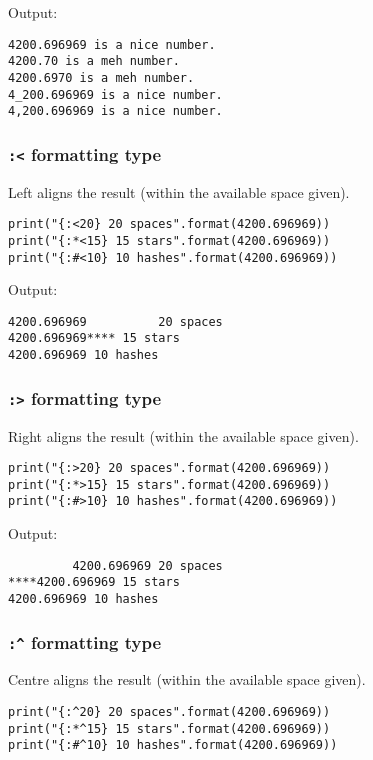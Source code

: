 \documentclass[11pt]{article}
\begin{document}
 \noindent Output:

\label{org632bb04}
\begin{verbatim}
4200.696969 is a nice number.
4200.70 is a meh number.
4200.6970 is a meh number.
4_200.696969 is a nice number.
4,200.696969 is a nice number.
\end{verbatim}
\subsubsection{\texttt{:<} formatting type}
\label{sec:org0985c48}
Left aligns the result (within the available space given).

\begin{verbatim}
print("{:<20} 20 spaces".format(4200.696969))
print("{:*<15} 15 stars".format(4200.696969))
print("{:#<10} 10 hashes".format(4200.696969))
\end{verbatim}

 \noindent Output:

\label{org31b7475}
\begin{verbatim}
4200.696969          20 spaces
4200.696969**** 15 stars
4200.696969 10 hashes
\end{verbatim}
\subsubsection{\texttt{:>} formatting type}
\label{sec:org7b2e0c6}
Right aligns the result (within the available space given).

\begin{verbatim}
print("{:>20} 20 spaces".format(4200.696969))
print("{:*>15} 15 stars".format(4200.696969))
print("{:#>10} 10 hashes".format(4200.696969))
\end{verbatim}

 \noindent Output:

\label{orgdc361dc}
\begin{verbatim}
         4200.696969 20 spaces
****4200.696969 15 stars
4200.696969 10 hashes
\end{verbatim}
\subsubsection{\texttt{:\textasciicircum{}} formatting type}
\label{sec:org9e62785}
Centre aligns the result (within the available space given).

\begin{verbatim}
print("{:^20} 20 spaces".format(4200.696969))
print("{:*^15} 15 stars".format(4200.696969))
print("{:#^10} 10 hashes".format(4200.696969))
\end{verbatim}
\end{document}
